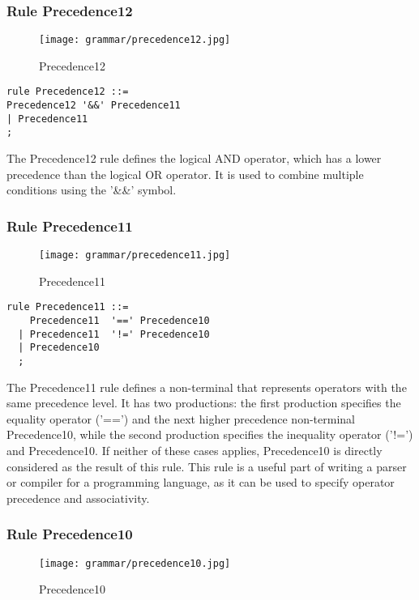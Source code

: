 \subsubsection*{Rule Precedence12}

\begin{figure}[!ht]
\centering
\texttt{[image: grammar/precedence12.jpg]}
\caption{Precedence12}
\end{figure}

\begin{lstlisting}
rule Precedence12 ::=
Precedence12 '&&' Precedence11
| Precedence11
;
\end{lstlisting}

The Precedence12 rule defines the logical AND operator, which has a lower precedence than the logical OR operator. It is used to combine multiple conditions using the '\&\&' symbol.

\subsubsection*{Rule Precedence11}

\begin{figure}[!ht]
\centering
\texttt{[image: grammar/precedence11.jpg]}
\caption{Precedence11}
\end{figure}

\begin{lstlisting}
rule Precedence11 ::=
    Precedence11  '==' Precedence10 
  | Precedence11  '!=' Precedence10 
  | Precedence10 
  ;
\end{lstlisting}

The Precedence11 rule defines a non-terminal that represents operators with the same precedence level. It has two productions: the first production specifies the equality operator ('==') and the next higher precedence non-terminal Precedence10, while the second production specifies the inequality operator ('!=') and Precedence10. If neither of these cases applies, Precedence10 is directly considered as the result of this rule. This rule is a useful part of writing a parser or compiler for a programming language, as it can be used to specify operator precedence and associativity.

\subsubsection*{Rule Precedence10}

\begin{figure}[!ht]
\centering
\texttt{[image: grammar/precedence10.jpg]}
\caption{Precedence10}
\end{figure}

